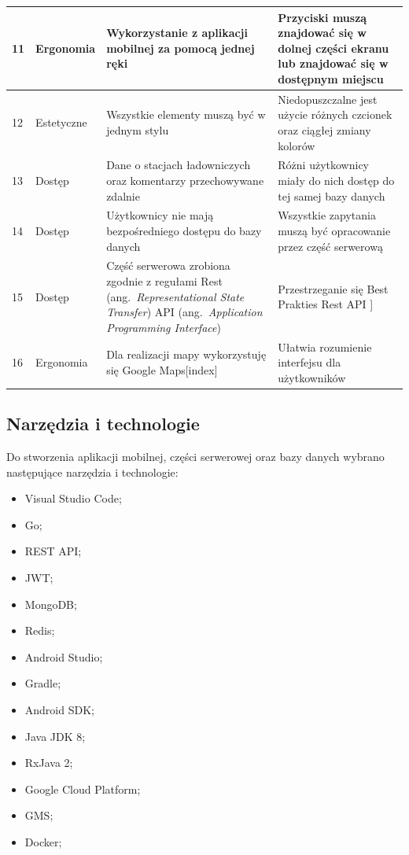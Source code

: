 \begin{table}[htb]
\begin{tabular}{| m{0.5cm} | m{3cm} | m{5.75cm} | m{5.75cm} |}
    \hline
    11 & Ergonomia & Wykorzystanie z aplikacji mobilnej za pomocą jednej ręki & Przyciski muszą znajdować się w dolnej części ekranu lub znajdować się w dostępnym miejscu \\
    \hline
    12 & Estetyczne & Wszystkie elementy muszą być w jednym stylu & Niedopuszczalne jest użycie różnych czcionek oraz ciągłej zmiany kolorów \\
    \hline
    13 & Dostęp & Dane o stacjach ładowniczych oraz komentarzy przechowywane zdalnie & Różni użytkownicy miały do nich dostęp do tej samej bazy danych \\
    \hline
    14 & Dostęp & Użytkownicy nie mają bezpośredniego dostępu do bazy danych & Wszystkie zapytania muszą być opracowanie przez część serwerową \\
    \hline
    15 & Dostęp & Część serwerowa zrobiona zgodnie z regułami Rest (ang.~\emph{Representational State Transfer}) API (ang.~\emph{Application Programming Interface}) & Przestrzeganie się Best Prakties Rest API \cite{rest_api_best}] \\
    \hline
    16 & Ergonomia & Dla realizacji mapy wykorzystuję się Google Maps[index] & Ułatwia rozumienie interfejsu dla użytkowników \\
    \hline
\end{tabular}
\end{table}
\newpage
\subsection{Narzędzia i technologie}
Do stworzenia aplikacji mobilnej, części serwerowej oraz bazy danych wybrano następujące narzędzia i technologie:
\begin{multicols}{3}
\begin{itemize}
    \item Visual Studio Code;
    \item Go;
    \item REST API;
    \item JWT;
    \item MongoDB;
    \item Redis;
    \item Android Studio;
    \item Gradle;
    \item Android SDK;
    \item Java JDK 8;
    \item RxJava 2;
    \item Google Cloud Platform;
    \item GMS;
    \item Docker;
\end{itemize}
\end{multicols}


